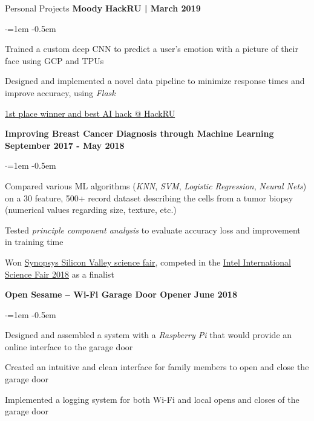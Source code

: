 \documentclass[margin,centered]{resume} %
\begin{document}
\begin{rSection}{Personal Projects}
{\bf Moody}  \hfill {\bf HackRU | March 2019}
 \begin{list}{$\cdot$}{\leftmargin=1em} %
   \itemsep -0.5em \vspace{-0.5em} %
	\item 
		Trained a custom deep CNN to predict a user’s emotion with a picture of their face using GCP and TPUs
	\item 
		Designed and implemented a novel data pipeline to minimize response times and improve accuracy, using \textit{Flask}
	\item
		\underline{1st place winner and best AI hack @ HackRU}
  \end{list}

{\bf Improving Breast Cancer Diagnosis through Machine Learning} \hfill {\bf September 2017 - May 2018}
 \begin{list}{$\cdot$}{\leftmargin=1em} %
   \itemsep -0.5em \vspace{-0.5em} %
	\item 
		Compared various ML algorithms (\textit{KNN}, \textit{SVM}, \textit{Logistic Regression}, \textit{Neural Nets}) on a 30 feature, 500+ record dataset describing the cells from a tumor biopsy (numerical values regarding size, texture, etc.)
	\item
		Tested \textit{principle component analysis} to evaluate accuracy loss and improvement in training time
	\item
		Won \underline{Synopsys Silicon Valley science fair}, competed in the \underline{Intel International Science Fair 2018} as a finalist
  \end{list}

{\bf Open Sesame – Wi-Fi Garage Door Opener}  \hfill {\bf June 2018}
 \begin{list}{$\cdot$}{\leftmargin=1em} %
   \itemsep -0.5em \vspace{-0.5em} %
	\item 
		Designed and assembled a system with a \textit{Raspberry Pi} that would provide an online interface to the garage door
	\item
		Created an intuitive and clean interface for family members to open and close the garage door
	\item
		Implemented a logging system for both Wi-Fi and local opens and closes of the garage door
  \end{list}


\end{rSection}
\end{document}
